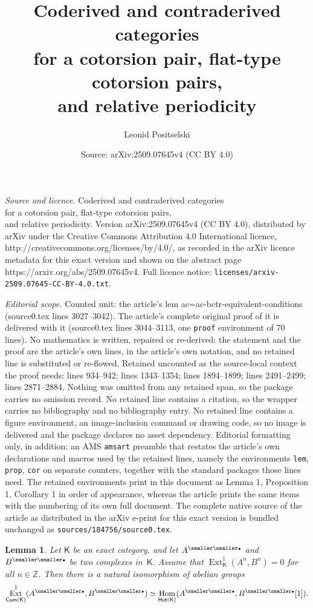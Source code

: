 \documentclass[10pt,a4paper]{amsart}
\title{Coderived and contraderived categories \\ for a cotorsion pair, flat-type cotorsion pairs, \\ and relative periodicity}
\author{Leonid Positselski}
\date{Source: arXiv:2509.07645v4 (CC BY 4.0)}
\newtheorem{lem}{Lemma}
\newcommand{\Com}{\mathsf{Com}}
\DeclareMathOperator{\Ext}{Ext}
\DeclareMathOperator{\Hom}{Hom}
\newcommand{\Hot}{\mathsf{Hot}}
\newcommand{\boZ}{\mathbb Z}
\newcommand{\bu}{{\text{\smaller\smaller$\scriptstyle\bullet$}}}
\newcommand{\sK}{\mathsf K}
\begin{document}
\maketitle

\noindent\emph{Source and licence.} Coderived and contraderived categories \\ for a cotorsion pair, flat-type cotorsion pairs, \\ and relative periodicity. Version arXiv:2509.07645v4 (CC BY 4.0), distributed by arXiv under the Creative Commons Attribution 4.0 International licence, http://creativecommons.org/licenses/by/4.0/, as recorded in the arXiv licence metadata for this exact version and shown on the abstract page https://arxiv.org/abs/2509.07645v4. Full licence notice: \texttt{licenses/arxiv-2509.07645-CC-BY-4.0.txt}.\par\smallskip

\noindent\textit{Editorial scope.} Counted unit: the article's lem ac=ac-bctr-equivalent-conditions (source0.tex lines 3027--3042). The article's complete original proof of it is delivered with it (source0.tex lines 3044--3113, one \texttt{proof} environment of 70 lines). No mathematics is written, repaired or re-derived: the statement and the proof are the article's own lines, in the article's own notation, and no retained line is substituted or re-flowed.  Retained uncounted as the source-local context the proof needs: lines 934--942; lines 1343--1354; lines 1894--1899; lines 2491--2499; lines 2871--2884.  Nothing was omitted from any retained span, so the package carries no omission record.  No retained line contains a citation, so the wrapper carries no bibliography and no bibliography entry.  No retained line contains a figure environment, an image-inclusion command or drawing code, so no image is delivered and the package declares no asset dependency.  Editorial formatting only, in addition: an AMS \texttt{amsart} preamble that restates the article's own declarations and macros used by the retained lines, namely the environments \texttt{lem}, \texttt{prop}, \texttt{cor} on separate counters, together with the standard packages those lines need.  The retained environments print in this document as Lemma 1, Proposition 1, Corollary 1 in order of appearance, whereas the article prints the same items with the numbering of its own full document.  The complete native source of the article as distributed in the arXiv e-print for this exact version is bundled unchanged as \texttt{sources/184756/source0.tex}.
\begin{lem} \label{Ext1-as-homotopy-Hom-lemma}
 Let\/ $\sK$ be an exact category, and let $A^\bu$ and $B^\bu$ be two
complexes in\/~$\sK$.
 Assume that\/ $\Ext^1_\sK(A^n,B^n)=0$ for all $n\in\boZ$.
 Then there is a natural isomorphism of abelian groups
$$
 \Ext^1_{\Com(\sK)}(A^\bu,B^\bu)\simeq\Hom_{\Hot(\sK)}(A^\bu,B^\bu[1]).
$$
\end{lem}
\end{document}
